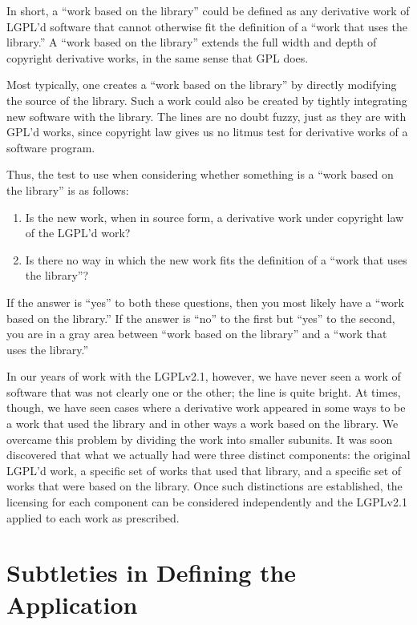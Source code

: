 In short, a ``work based on the library'' could be defined as any
derivative work of LGPL'd software that cannot otherwise fit the
definition of a ``work that uses the library.''  A ``work based on the
library'' extends the full width and depth of copyright derivative works,
in the same sense that GPL does.

Most typically, one creates a ``work based on the library'' by directly
modifying the source of the library. Such a work could also be created by
tightly integrating new software with the library. The lines are no doubt
fuzzy, just as they are with GPL'd works, since copyright law gives us no
litmus test for derivative works of a software program.

Thus, the test to use when considering whether something is a ``work
based on the library'' is as follows:

\begin{enumerate}

\item Is the new work, when in source form, a derivative work under
  copyright law of the LGPL'd work?

\item Is there no way in which the new work fits the definition of a
  ``work that uses the library''?
\end{enumerate}


If the answer is ``yes'' to both these questions, then you most likely
have a ``work based on the library.''  If the answer is ``no'' to the
first but ``yes'' to the second, you are in a gray area between ``work
based on the library'' and a ``work that uses the library.''

In our years of work with the LGPLv2.1, however, we have never seen a work
of software that was not clearly one or the other; the line is quite
bright. At times, though, we have seen cases where a derivative work
appeared in some ways to be a work that used the library and in other
ways a work based on the library. We overcame this problem by
dividing the work into smaller subunits. It was soon discovered that
what we actually had were three distinct components: the original
LGPL'd work, a specific set of works that used that library, and a
specific set of works that were based on the library. Once such
distinctions are established, the licensing for each component can be
considered independently and the LGPLv2.1 applied to each work as
prescribed.


\section{Subtleties in Defining the Application}

